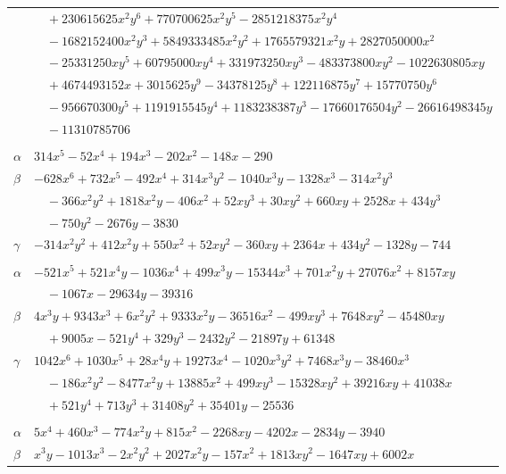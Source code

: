 \documentclass[11pt]{article}
\begin{document}
\begin{longtable}{@{}ll@{}}
 & $\quad +230615625x^{2}y^{6}+770700625x^{2}y^{5}-2851218375x^{2}y^{4}$\\
 & $\quad -1682152400x^{2}y^{3}+5849333485x^{2}y^{2}+1765579321x^{2}y+2827050000x^{2}$\\
 & $\quad -25331250xy^{5}+60795000xy^{4}+331973250xy^{3}-483373800xy^{2}-1022630805xy$\\
 & $\quad +4674493152x+3015625y^{9}-34378125y^{8}+122116875y^{7}+15770750y^{6}$\\
 & $\quad -956670300y^{5}+1191915545y^{4}+1183238387y^{3}-17660176504y^{2}-26616498345y$\\
 & $\quad -11310785706$\\
\addlinespace[3pt]
\multicolumn{2}{@{}l}{$\{i,j\}=\{33,34\}$, $k_{ij}=2^{3}\cdot 7\cdot 13$}\\
$\alpha$ & $314x^{5}-52x^{4}+194x^{3}-202x^{2}-148x-290$\\
$\beta$ & $-628x^{6}+732x^{5}-492x^{4}+314x^{3}y^{2}-1040x^{3}y-1328x^{3}-314x^{2}y^{3}$\\
 & $\quad -366x^{2}y^{2}+1818x^{2}y-406x^{2}+52xy^{3}+30xy^{2}+660xy+2528x+434y^{3}$\\
 & $\quad -750y^{2}-2676y-3830$\\
$\gamma$ & $-314x^{2}y^{2}+412x^{2}y+550x^{2}+52xy^{2}-360xy+2364x+434y^{2}-1328y-744$\\
\addlinespace[3pt]
\multicolumn{2}{@{}l}{$\{i,j\}=\{34,122\}$, $k_{ij}=2^{4}\cdot 3\cdot 5\cdot 13^{2}$}\\
$\alpha$ & $-521x^{5}+521x^{4}y-1036x^{4}+499x^{3}y-15344x^{3}+701x^{2}y+27076x^{2}+8157xy$\\
 & $\quad -1067x-29634y-39316$\\
$\beta$ & $4x^{3}y+9343x^{3}+6x^{2}y^{2}+9333x^{2}y-36516x^{2}-499xy^{3}+7648xy^{2}-45480xy$\\
 & $\quad +9005x-521y^{4}+329y^{3}-2432y^{2}-21897y+61348$\\
$\gamma$ & $1042x^{6}+1030x^{5}+28x^{4}y+19273x^{4}-1020x^{3}y^{2}+7468x^{3}y-38460x^{3}$\\
 & $\quad -186x^{2}y^{2}-8477x^{2}y+13885x^{2}+499xy^{3}-15328xy^{2}+39216xy+41038x$\\
 & $\quad +521y^{4}+713y^{3}+31408y^{2}+35401y-25536$\\
\addlinespace[3pt]
\multicolumn{2}{@{}l}{$\{i,j\}=\{34,147\}$, $k_{ij}=2^{2}\cdot 3^{2}\cdot 7\cdot 13$}\\
$\alpha$ & $5x^{4}+460x^{3}-774x^{2}y+815x^{2}-2268xy-4202x-2834y-3940$\\
$\beta$ & $x^{3}y-1013x^{3}-2x^{2}y^{2}+2027x^{2}y-157x^{2}+1813xy^{2}-1647xy+6002x$\\

\end{longtable}
\end{document}
